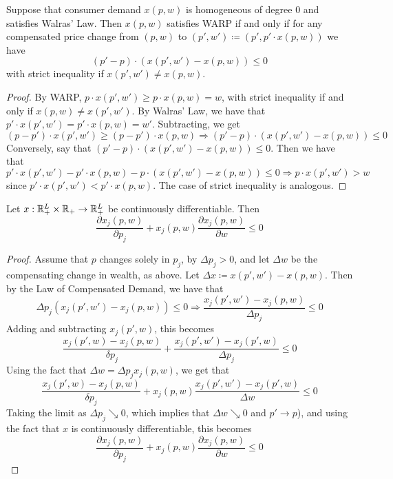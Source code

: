 \documentclass[12pt]{article}
\begin{document}
\begin{proposition}
	 Suppose that consumer demand $x(p,w)$ is homogeneous of degree 0 and satisfies Walras' Law. Then $x(p,w)$ satisfies WARP if and only if for any compensated price change from $(p,w)$ to $(p',w') \coloneqq (p',p' \cdot x(p,w))$ we have
	\[
	(p' - p)\cdot (x(p',w') - x(p,w)) \le 0
	\] 
	with strict inequality if $x(p',w') \ne x(p,w)$.
\end{proposition}
\begin{proof}
	By WARP, $p \cdot x(p',w') \ge p \cdot x(p,w) = w$, with strict inequality if and only if $x(p,w) \ne x(p',w')$. By Walras' Law, we have that $p'\cdot x(p',w') = p'\cdot x(p,w) = w'$. Subtracting, we get
	\[
	(p - p') \cdot x(p',w') \ge (p - p')\cdot x(p,w) \Longrightarrow (p' - p) \cdot (x(p',w') - x(p,w)) \le 0
	\]
	Conversely, say that $(p' - p) \cdot (x(p',w') - x(p,w)) \le 0$. Then we have that
	\[
	p' \cdot x(p',w') - p' \cdot x(p,w) - p \cdot (x(p',w') - x(p,w)) \le 0 \Longrightarrow p \cdot x(p',w') > w
	\]
	since $p' \cdot x(p',w') < p' \cdot x(p,w)$. The case of strict inequality is analogous.
\end{proof}

\begin{proposition}\label{prop:law_of_demand}
	Let $x : \mathbb{R}^L_+ \times \mathbb{R}_+ \to \mathbb{R}^L_+$ be continuously differentiable. Then
	\[
	\frac{\partial x_j(p,w)}{\partial p_j} + x_j(p,w) \frac{\partial x_j(p,w)}{\partial w} \le 0
	\]
\end{proposition}
\begin{proof}
	Assume that $p$ changes solely in $p_j$, by $\Delta p_j > 0$, and let $\Delta w$ be the compensating change in wealth, as above. Let $\Delta x \coloneqq x(p',w') - x(p,w)$. Then by the Law of Compensated Demand, we have that
	\[
	\Delta p_j (x_j(p',w') - x_j(p,w)) \le 0 \Longrightarrow \frac{x_j(p',w') - x_j(p,w)}{\Delta p_j} \le 0
	\]
	Adding and subtracting $x_j(p',w)$, this becomes
	\[
	\frac{x_j(p',w) - x_j(p,w)}{\delta p_j} + \frac{x_j(p',w') - x_j(p',w)}{\Delta p_j} \le 0
	\]
	Using the fact that $\Delta w = \Delta p_j x_j(p,w)$, we get that
	\[
	\frac{x_j(p',w) - x_j(p,w)}{\delta p_j} + x_j(p,w)\frac{x_j(p',w') - x_j(p',w)}{\Delta w} \le 0
	\]
	Taking the limit as $\Delta p_j \searrow 0$, which implies that $\Delta w \searrow 0$ and $p' \to p$), and using the fact that $x$ is continuously differentiable, this becomes
	\[
	\frac{\partial x_j(p,w)}{\partial p_j} + x_j(p,w) \frac{\partial x_j(p,w)}{\partial w} \le 0
	\]
\end{proof}
\end{document}
